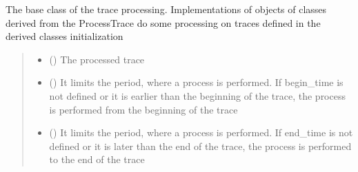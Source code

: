 \documentclass[letterpaper,10pt,english]{sphinxmanual}
\begin{document}
\begin{fulllineitems}
\label{\detokenize{api_core:core.utils.ProcessTrace}}
\pysigstartsignatures
{}
\pysigstopsignatures
\sphinxAtStartPar
The base class of the trace processing. Implementations of objects of classes derived from the ProcessTrace
do some processing on traces defined in the derived classes initialization
\begin{quote}\begin{description}
\begin{itemize}
\item {} 
\sphinxAtStartPar
{} () \textendash{} The processed trace

\item {} 
\sphinxAtStartPar
{} () \textendash{} It limits the period, where a process is performed.
If begin\_time is not defined or it is earlier than the beginning of the trace,
the process is performed from the beginning of the trace

\item {} 
\sphinxAtStartPar
{} () \textendash{} It limits the period, where a process is performed.
If end\_time is not defined or it is later than the end of the trace,
the process is performed to the end of the trace

\end{itemize}

\end{description}\end{quote}

\end{fulllineitems}

\end{document}
